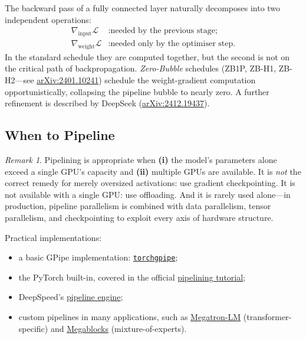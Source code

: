 \documentclass[11pt,a4paper]{article}
\theoremstyle{definition}
\theoremstyle{remark}
\newtheorem*{remark}{Remark}
\theoremstyle{plain}
\newcommand{\grad}{\nabla}
\newcommand{\LL}{\mathcal{L}}
\begin{document}
The backward pass of a fully connected layer naturally decomposes into
two independent operations:
\begin{align}
\grad_{\text{input}} \LL &: \text{needed by the previous stage;} \\
\grad_{\text{weight}} \LL &: \text{needed only by the optimiser step.}
\end{align}
In the standard schedule they are computed together, but the second is
not on the critical path of backpropagation. \emph{Zero-Bubble} schedules
(ZB1P, ZB-H1, ZB-H2---see
\href{https://arxiv.org/abs/2401.10241}{arXiv:2401.10241}) schedule the
weight-gradient computation opportunistically, collapsing the pipeline
bubble to nearly zero. A further refinement is described by DeepSeek
(\href{https://arxiv.org/abs/2412.19437}{arXiv:2412.19437}).

\subsection{When to Pipeline}

\begin{remark}
Pipelining is appropriate when \textbf{(i)} the model's parameters alone
exceed a single GPU's capacity and \textbf{(ii)} multiple GPUs are
available. It is \emph{not} the correct remedy for merely oversized
activations: use gradient checkpointing. It is not available with a
single GPU: use offloading. And it is rarely used alone---in production,
pipeline parallelism is combined with data parallelism, tensor
parallelism, and checkpointing to exploit every axis of hardware
structure.
\end{remark}

Practical implementations:
\begin{itemize}[leftmargin=1.5em, itemsep=2pt]
    \item a basic GPipe implementation:
          \href{https://github.com/kakaobrain/torchgpipe}{\texttt{torchgpipe}};
    \item the PyTorch built-in, covered in the official
          \href{https://pytorch.org/tutorials/intermediate/pipelining_tutorial.html}{pipelining
          tutorial};
    \item DeepSpeed's
          \href{https://deepspeed.readthedocs.io/en/latest/pipeline.html}{pipeline
          engine};
    \item custom pipelines in many applications, such as
          \href{https://github.com/NVIDIA/Megatron-LM}{Megatron-LM}
          (transformer-specific) and
          \href{https://github.com/databricks/megablocks}{Megablocks}
          (mixture-of-experts).
\end{itemize}
\end{document}
